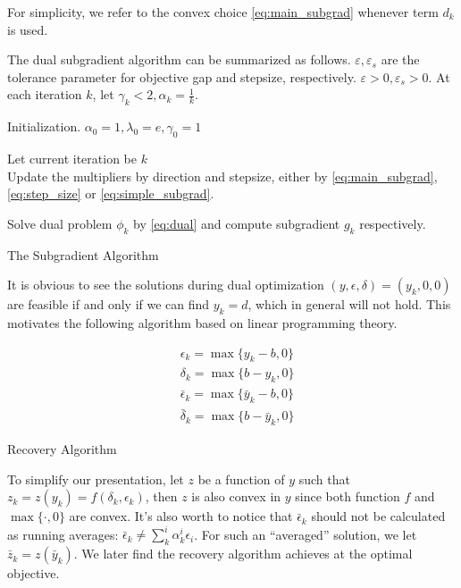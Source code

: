 \documentclass[../main]{subfiles}
\begin{document}
For simplicity, we refer to the convex choice \eqref{eq:main_subgrad} whenever term \(d_k\) is used.

The dual subgradient algorithm can be summarized as follows.
\(\varepsilon,\varepsilon_s\) are the tolerance parameter for objective gap and stepsize, respectively.
\(\varepsilon > 0 ,\varepsilon_s > 0\). At each iteration \(k\), let \(\gamma_k < 2, \alpha_k = \frac{1}{k}\).

\begin{algorithm}[H]
  \SetAlgoLined
  Initialization. \(\alpha_0 = 1, \lambda_0 = e, \gamma_0 = 1\)  \\
  {
    Let current iteration be \(k\)\\
    Update the multipliers by direction and stepsize, either by \eqref{eq:main_subgrad}, \eqref{eq:step_size} or \eqref{eq:simple_subgrad}.

    Solve dual problem \(\phi_k\) by \eqref{eq:dual}
    and compute subgradient \(g_k\) respectively.
  }
  \caption{The Subgradient Algorithm}
\end{algorithm}

It is obvious to see the solutions during dual optimization
\((y, \epsilon, \delta) = (y_k, 0, 0)\) are feasible if and only if we
can find \(y_k = d\), which in general will not hold. This motivates the following
algorithm based on linear programming theory.

\begin{algorithm}[H]\label{alg:recovery}
  \SetAlgoLined
  \begin{equation}\label{eq:recovery}
    \begin{aligned}
       & \epsilon_k = \max\{y_k - b, 0\}           \\
       & \delta_k = \max\{b - y_k, 0\}             \\
       & \bar \epsilon_k = \max\{\bar y_k - b, 0\} \\
       & \bar \delta_k = \max\{b - \bar y_k, 0\}
    \end{aligned}\end{equation}
  \caption{Recovery Algorithm}
\end{algorithm}

To simplify our presentation, let
\(z\) be a function of \(y\) such that \(z_k = z(y_k) = f(\delta_k, \epsilon_k)\), then \(z\) is
also convex in \(y\) since both function \(f\) and \(\max\{\cdot, 0\}\)
are convex. It's also worth to notice that \(\bar \epsilon_k\) should
not be calculated as running averages:
\(\bar \epsilon_k \neq \sum^i_k \alpha^i_k \epsilon_i\). For such an
``averaged'' solution, we let
\(\bar z_k = z(\bar y_k)\). We later find the recovery algorithm achieves
at the optimal objective.
\end{document}
